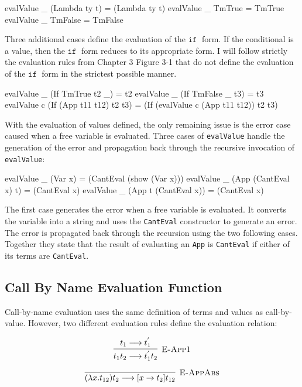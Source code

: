\documentclass[10pt]{article}
\newcommand{\IF}{\ensuremath{\mathtt{ if \;}}}
\begin{document}
\begin{code}
  evalValue _ (Lambda ty t) = (Lambda ty t)
  evalValue _ TmTrue = TmTrue
  evalValue _ TmFalse = TmFalse
\end{code}

Three additional cases define the evaluation of the $\IF$ form.  If
the conditional is a value, then the $\IF$ form reduces to its
appropriate form.  I will follow strictly the evaluation rules from
Chapter 3 Figure 3-1 that do not define the evaluation of the $\IF$
form in the strictest possible manner.

\begin{code}
  evalValue _ (If TmTrue t2 _) = t2
  evalValue _ (If TmFalse _ t3) = t3
  evalValue c (If (App t11 t12) t2 t3) = 
    (If (evalValue c (App t11 t12)) t2 t3)
\end{code}

With the evaluation of values defined, the only remaining issue is the
error case caused when a free variable is evaluated.  Three cases of
\texttt{evalValue} handle the generation of the error and propagation
back through the recursive invocation of \texttt{evalValue}:

\begin{code}
  evalValue _ (Var x) = (CantEval (show (Var x)))
  evalValue _ (App (CantEval x) t) = (CantEval x)
  evalValue _ (App t (CantEval x)) = (CantEval x)
\end{code}

The first case generates the error when a free variable is evaluated.
It converts the variable into a string and uses the \texttt{CantEval}
constructor to generate an error.  The error is propagated back
through the recursion using the two following cases.  Together they
state that the result of evaluating an \texttt{App} is
\texttt{CantEval} if either of its terms are \texttt{CantEval}.

\subsection{Call By Name Evaluation Function}

Call-by-name evaluation uses the same definition of terms and values
as call-by-value.  However, two different evaluation rules define the
evaluation relation:

\[\vcenter{\infer[\textsc{E-App1}]{t_1 t_2 \longrightarrow t_1^{'} t_2}{t_1\longrightarrow t_1^{'}}}\]

\[\vcenter{\infer[\textsc{E-AppAbs}]{(\lambda x.t_{12})t_2 \longrightarrow [x\rightarrow t_2]t_{12}}{}}\]
\end{document}
